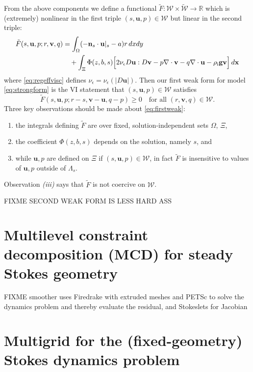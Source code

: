 \documentclass[letterpaper,final,12pt,reqno]{amsart}
\theoremstyle{claim}
\newcommand{\eps}{\epsilon}
\newcommand{\RR}{\mathbb{R}}
\newcommand{\Div}{\nabla\cdot}
\newcommand{\bg}{\mathbf{g}}
\newcommand{\bn}{\mathbf{n}}
\newcommand{\bu}{\mathbf{u}}
\newcommand{\bv}{\mathbf{v}}
\newcommand{\bx}{\mathbf{x}}
\newcommand{\rhoi}{\rho_{\text{i}}}
\numberwithin{equation}{section}
\numberwithin{figure}{section}
\numberwithin{table}{section}
\numberwithin{theorem}{section}
\begin{document}
From the above components we define a functional $\tilde F : \mathcal{W} \times \tilde{\mathcal{W}} \to \RR$ which is (extremely) nonlinear in the first triple $(s,\bu,p) \in \mathcal{W}$ but linear in the second triple:
\begin{align}
\tilde F(s,\bu,p;r,\bv,q) &= \int_\Omega (-\bn_s \cdot \bu|_s - a) r \,dx dy \\
   &\quad + \int_\Xi \Phi(z,b,s) \Big[2 \nu_\eps D\bu : D\bv - p \Div\bv - q \Div\bu - \rhoi \bg \bv\Big]\,d\bx \notag
\end{align}
where \eqref{eq:regeffvisc} defines $\nu_\eps = \nu_\eps(|D\bu|)$.  Then our first weak form for model \eqref{eq:strongform} is the VI statement that $(s,\bu,p) \in \mathcal{W}$ satisfies
\begin{equation}
\tilde F(s,\bu,p;r-s,\bv-\bu,q-p) \ge 0 \quad \text{for all } (r,\bv,q) \in \mathcal{W}.\label{eq:firstweak}
\end{equation}
Three key observations should be made about \eqref{eq:firstweak}:
\renewcommand{\labelenumi}{\emph{(\roman{enumi})}}
\begin{enumerate}
\item the integrals defining $\tilde F$ are over fixed, solution-independent sets $\Omega$, $\Xi$,
\item the coefficient $\Phi(z,b,s)$ depends on the solution, namely $s$, and
\item while $\bu,p$ are defined on $\Xi$ if $(s,\bu,p) \in \mathcal{W}$, in fact $\tilde F$ is insensitive to values of $\bu,p$ outside of $\Lambda_s$.
\end{enumerate}
Observation \emph{(iii)} says that $\tilde F$ is not coercive \cite{KinderlehrerStampacchia1980} on $\mathcal{W}$.

FIXME SECOND WEAK FORM IS LESS HARD ASS

\section{Multilevel constraint decomposition (MCD) for steady Stokes geometry} \label{sec:mcdstokes}

FIXME smoother uses Firedrake \cite{Alnaesetal2014,Rathgeberetal2016} with extruded meshes \cite{Gibsonetal2019,McRaeetal2016} and PETSc \cite{Balayetal2020,Bueler2021} to solve the dynamics problem and thereby evaluate the residual, and Stokeslets for Jacobian

\section{Multigrid for the (fixed-geometry) Stokes dynamics problem} \label{sec:stokesdynamics}
\end{document}
